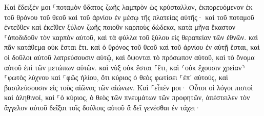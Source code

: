 \documentclass{openreader}
\begin{document}
Καὶ ἔδειξέν μοι ⸀ποταμὸν ὕδατος ζωῆς λαμπρὸν ὡς κρύσταλλον, ἐκπορευόμενον ἐκ τοῦ θρόνου τοῦ θεοῦ καὶ τοῦ ἀρνίου 
ἐν μέσῳ τῆς πλατείας αὐτῆς· καὶ τοῦ ποταμοῦ ἐντεῦθεν καὶ ἐκεῖθεν ξύλον ζωῆς ποιοῦν καρποὺς δώδεκα, κατὰ μῆνα ἕκαστον ⸀ἀποδιδοῦν τὸν καρπὸν αὐτοῦ, καὶ τὰ φύλλα τοῦ ξύλου εἰς θεραπείαν τῶν ἐθνῶν. 
καὶ πᾶν κατάθεμα οὐκ ἔσται ἔτι. καὶ ὁ θρόνος τοῦ θεοῦ καὶ τοῦ ἀρνίου ἐν αὐτῇ ἔσται, καὶ οἱ δοῦλοι αὐτοῦ λατρεύσουσιν αὐτῷ, 
καὶ ὄψονται τὸ πρόσωπον αὐτοῦ, καὶ τὸ ὄνομα αὐτοῦ ἐπὶ τῶν μετώπων αὐτῶν. 
καὶ νὺξ οὐκ ἔσται ⸀ἔτι, καὶ ⸂οὐκ ἔχουσιν χρείαν⸃ ⸀φωτὸς λύχνου καὶ ⸀φῶς ἡλίου, ὅτι κύριος ὁ θεὸς φωτίσει ⸀ἐπ’ αὐτούς, καὶ βασιλεύσουσιν εἰς τοὺς αἰῶνας τῶν αἰώνων. 
Καὶ ⸀εἶπέν μοι· Οὗτοι οἱ λόγοι πιστοὶ καὶ ἀληθινοί, καὶ ⸀ὁ κύριος, ὁ θεὸς τῶν πνευμάτων τῶν προφητῶν, ἀπέστειλεν τὸν ἄγγελον αὐτοῦ δεῖξαι τοῖς δούλοις αὐτοῦ ἃ δεῖ γενέσθαι ἐν τάχει· 
\end{document}
